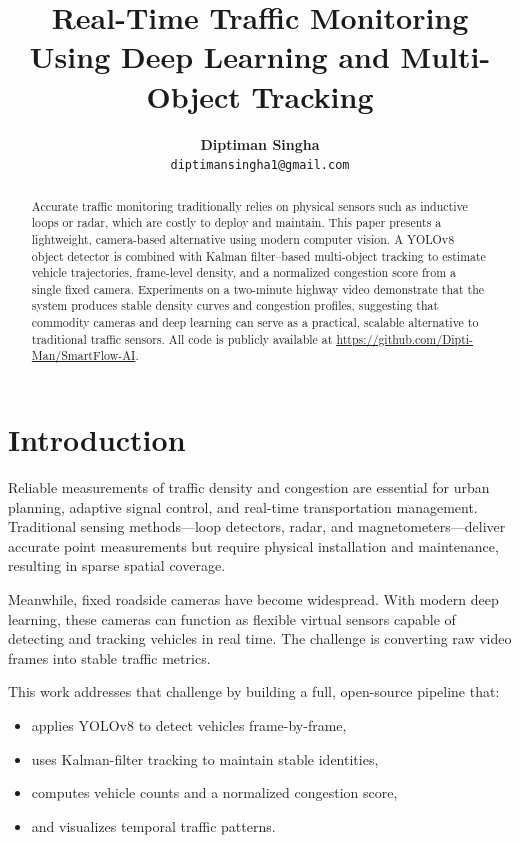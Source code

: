 \documentclass[12pt]{article}
\title{\textbf{Real-Time Traffic Monitoring Using Deep Learning and Multi-Object Tracking}}
\author{
\textbf{Diptiman Singha}\\
\texttt{diptimansingha1@gmail.com}
}
\date{}
\begin{document}
\maketitle

\begin{abstract}
\noindent
Accurate traffic monitoring traditionally relies on physical sensors such as inductive loops or radar, which are costly to deploy and maintain. This paper presents a lightweight, camera-based alternative using modern computer vision. A YOLOv8 object detector is combined with Kalman filter--based multi-object tracking to estimate vehicle trajectories, frame-level density, and a normalized congestion score from a single fixed camera. Experiments on a two-minute highway video demonstrate that the system produces stable density curves and congestion profiles, suggesting that commodity cameras and deep learning can serve as a practical, scalable alternative to traditional traffic sensors. All code is publicly available at \url{https://github.com/Dipti-Man/SmartFlow-AI}.
\end{abstract}

\section{Introduction}
Reliable measurements of traffic density and congestion are essential for urban planning, adaptive signal control, and real-time transportation management. Traditional sensing methods---loop detectors, radar, and magnetometers---deliver accurate point measurements but require physical installation and maintenance, resulting in sparse spatial coverage.

Meanwhile, fixed roadside cameras have become widespread. With modern deep learning, these cameras can function as flexible virtual sensors capable of detecting and tracking vehicles in real time. The challenge is converting raw video frames into stable traffic metrics.

This work addresses that challenge by building a full, open-source pipeline that:
\begin{itemize}
    \item applies YOLOv8 to detect vehicles frame-by-frame,
    \item uses Kalman-filter tracking to maintain stable identities,
    \item computes vehicle counts and a normalized congestion score,
    \item and visualizes temporal traffic patterns.
\end{itemize}
\end{document}
